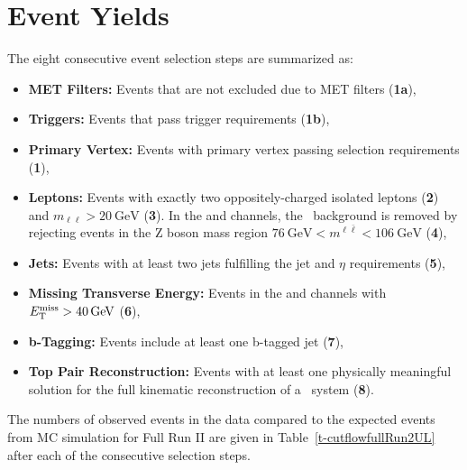 \section{Event Yields}
The eight consecutive event selection steps are summarized as:
\begin{itemize}
    \item {\bf MET Filters:} Events that are not excluded due to MET filters ({\bf 1a}),
    \item {\bf Triggers:} Events that pass trigger requirements ({\bf 1b}),
    \item {\bf Primary Vertex:} Events with primary vertex passing selection requirements ({\bf 1}),
    \item {\bf Leptons:} Events with exactly two oppositely-charged isolated leptons ({\bf 2}) and $m_{\ell\ell} > \SI{20}{\GeV}$ ({\bf 3}).  
            In the \mumu and \ee channels, the \zjets\ background is removed by rejecting events in the Z boson mass region $\SI{76}{\GeV} < m^{\ell\bar{\ell}} < \SI{106}{\GeV}$ ({\bf 4}),
    \item {\bf Jets:} Events with at least two jets fulfilling the jet \pT and $\eta$ requirements ({\bf 5}),
    \item {\bf Missing Transverse Energy:} Events in the \mumu and \ee channels with $\ETmiss > \SI{40}{\GeV}$ ({\bf 6}),
    \item {\bf b-Tagging:} Events include at least one b-tagged jet ({\bf 7}),
    \item {\bf Top Pair Reconstruction:} Events with at least one physically meaningful solution for the full kinematic reconstruction of a \ttbar\ system ({\bf 8}).
\end{itemize}
The numbers of observed events in the data compared to the expected events from MC simulation for Full Run II are given in Table~\ref{t-cutflowfullRun2UL} after each of the consecutive selection steps.

